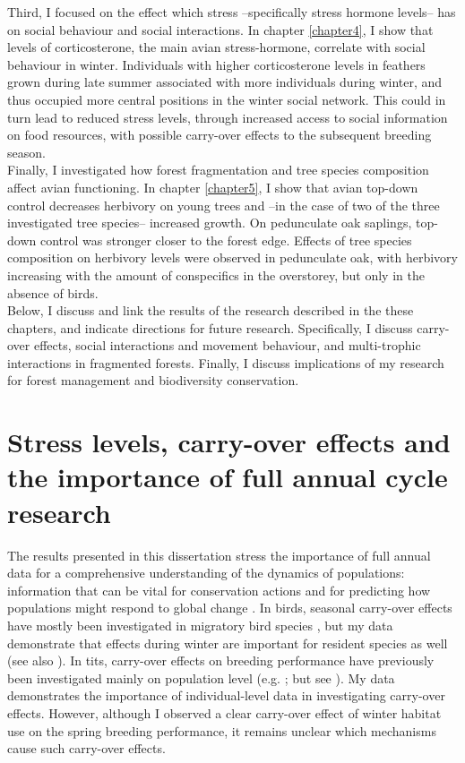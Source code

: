 \documentclass[10pt, twoside]{book} %
\begin{document}
Third, I focused on the effect which stress --specifically stress hormone levels-- has on social behaviour and social interactions. In chapter \ref{chapter4}, I show that levels of corticosterone, the main avian stress-hormone, correlate with social behaviour in winter. Individuals with higher corticosterone levels in feathers grown during late summer associated with more individuals during winter, and thus occupied more central positions in the winter social network. This could in turn lead to reduced stress levels, through increased access to social information on food resources, with possible carry-over effects to the subsequent breeding season.\\

Finally, I investigated how forest fragmentation and tree species composition affect avian functioning. In chapter \ref{chapter5}, I show that avian top-down control decreases herbivory on young trees and --in the case of two of the three investigated tree species-- increased growth. On pedunculate oak saplings, top-down control was stronger closer to the forest edge. Effects of tree species composition on herbivory levels were observed in pedunculate oak, with herbivory increasing with the amount of conspecifics in the overstorey, but only in the absence of birds.\\

Below, I discuss and link the results of the research described in the these chapters, and indicate directions for future research. Specifically, I discuss carry-over effects, social interactions and movement behaviour, and multi-trophic interactions in fragmented forests. Finally, I discuss implications of my research for forest management and biodiversity conservation.\\

	\section{Stress levels, carry-over effects and the importance of full annual cycle research}
	
The results presented in this dissertation stress the importance of full annual data for a comprehensive understanding of the dynamics of populations: information that can be vital for conservation actions and for predicting how populations might respond to global change \citep{Marra2015}. In birds, seasonal carry-over effects have mostly been investigated in migratory bird species \citep{Harrison2011, OConnor2014, Marra2015}, but my data demonstrate that effects during winter are important for resident species as well (see also \citealt{Williams2015}). In tits, carry-over effects on breeding performance have previously been investigated mainly on population level (e.g. \citealt{Robb2008a, Plummer2013a, Plummer2013}; but see \citealt{Crates2016}). My data demonstrates the importance of individual-level data in investigating carry-over effects. However, although I observed a clear carry-over effect of winter habitat use on the spring breeding performance, it remains unclear which mechanisms cause such carry-over effects.\\
\end{document}
